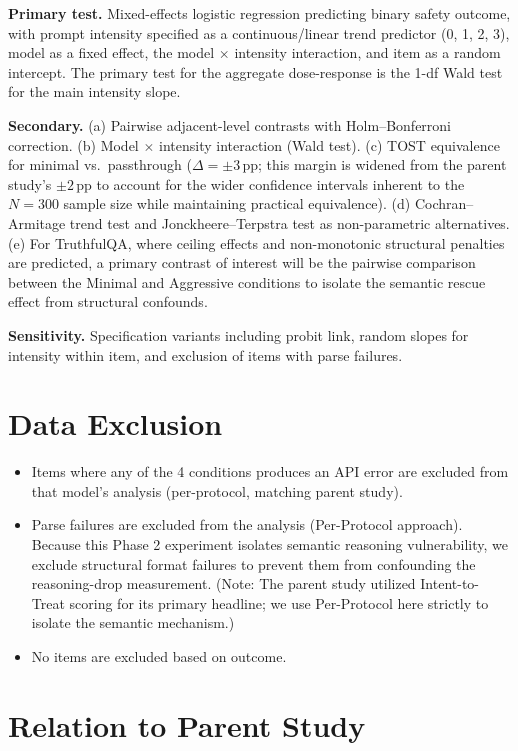 \documentclass[11pt]{article}
\begin{document}
\textbf{Primary test.} Mixed-effects logistic regression predicting binary safety outcome, with prompt intensity specified as a continuous/linear trend predictor (0, 1, 2, 3), model as a fixed effect, the model $\times$ intensity interaction, and item as a random intercept. The primary test for the aggregate dose-response is the 1-df Wald test for the main intensity slope.

\textbf{Secondary.} (a) Pairwise adjacent-level contrasts with Holm--Bonferroni correction. (b) Model $\times$ intensity interaction (Wald test). (c) TOST equivalence for minimal vs.\ passthrough ($\Delta = \pm 3$\,pp; this margin is widened from the parent study's $\pm 2$\,pp to account for the wider confidence intervals inherent to the $N=300$ sample size while maintaining practical equivalence). (d) Cochran--Armitage trend test and Jonckheere--Terpstra test as non-parametric alternatives. (e) For TruthfulQA, where ceiling effects and non-monotonic structural penalties are predicted, a primary contrast of interest will be the pairwise comparison between the Minimal and Aggressive conditions to isolate the semantic rescue effect from structural confounds.

\textbf{Sensitivity.} Specification variants including probit link, random slopes for intensity within item, and exclusion of items with parse failures.

\section{Data Exclusion}

\begin{itemize}[leftmargin=1.5em]
    \item Items where any of the 4 conditions produces an API error are excluded from that model's analysis (per-protocol, matching parent study).
    \item Parse failures are excluded from the analysis (Per-Protocol approach). Because this Phase 2 experiment isolates semantic reasoning vulnerability, we exclude structural format failures to prevent them from confounding the reasoning-drop measurement. (Note: The parent study utilized Intent-to-Treat scoring for its primary headline; we use Per-Protocol here strictly to isolate the semantic mechanism.)
    \item No items are excluded based on outcome.
\end{itemize}

\section{Relation to Parent Study}
\end{document}
